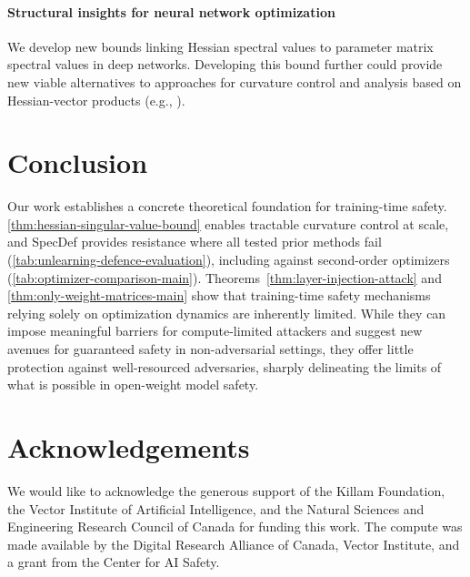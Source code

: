 \documentclass{article}
\theoremstyle{plain}
\theoremstyle{definition}
\theoremstyle{remark}
\begin{document}
\paragraph{Structural insights for neural network optimization} We develop new bounds linking Hessian spectral values to parameter matrix spectral values in deep networks. Developing this bound further could provide new viable alternatives to approaches for curvature control and analysis based on Hessian-vector products (e.g., \citealp{wang2025better}).

\section{Conclusion}

Our work establishes a concrete theoretical foundation for training-time safety. \cref{thm:hessian-singular-value-bound} enables tractable curvature control at scale, and SpecDef provides resistance where all tested prior methods fail (\cref{tab:unlearning-defence-evaluation}), including against second-order optimizers (\cref{tab:optimizer-comparison-main}). Theorems~\ref{thm:layer-injection-attack} and \ref{thm:only-weight-matrices-main} show that training-time safety mechanisms relying solely on optimization dynamics are inherently limited. While they can impose meaningful barriers for compute-limited attackers and suggest new avenues for guaranteed safety in non-adversarial settings, they offer little protection against well-resourced adversaries, sharply delineating the limits of what is possible in open-weight model safety.

\section*{Acknowledgements}

We would like to acknowledge the generous support of the Killam Foundation, the Vector Institute of Artificial Intelligence, and the Natural Sciences and Engineering Research Council of Canada for funding this work. The compute was made available by the Digital Research Alliance of Canada, Vector Institute, and a grant from the Center for AI Safety.
\end{document}
